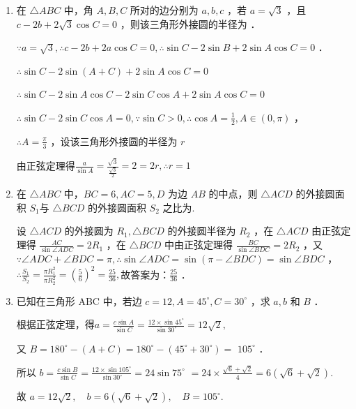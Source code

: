 \begin{enumerate}
\item 在 $\triangle A B C$ 中，角 $A, B, C$ 所对的边分别为 $a, b, c$ ，若 $a=\sqrt{3}$ ，且 $c-2 b+2 \sqrt{3} \cos C=0$ ，则该三角形外接圆的半径为 ．

\begin{jieda}
$\because a=\sqrt{3}, \therefore c-2 b+2 a \cos C=0, \therefore \sin C-2 \sin B+2 \sin A \cos C=0$ ．

$\therefore \sin C-2 \sin (A+C)+2 \sin A \cos C=0$

$\therefore \sin C-2 \sin A \cos C-2 \sin C \cos A+2 \sin A \cos C=0$

$\therefore \sin C-2 \sin C \cos A=0, \because \sin C>0, \therefore \cos A=\frac{1}{2}, A \in(0, \pi)$ ，

$\therefore A=\frac{\pi}{3}$ ，设该三角形外接圆的半径为 $r$

由正弦定理得$\frac{a}{\sin A}=\frac{\sqrt{3}}{\frac{\sqrt{3}}{2}}=2=2 r, \therefore r=1$
\end{jieda}


\item 在 $\triangle A B C$ 中，$B C=6, A C=5, D$ 为边 $A B$ 的中点，则 $\triangle A C D$ 的外接圆面积 $S_1$与 $\triangle B C D$ 的外接圆面积 $S_2$ 之比为.
\begin{jieda}
    设 $\triangle A C D$ 的外接圆为 $R_1, \triangle B C D$ 的外接圆半径为 $R_2$ ，在 $\triangle A C D$ 由正弦定理得 $\frac{A C}{\sin \angle A D C}=2 R_1$ ，在 $\triangle B C D$ 中由正弦定理得 $\frac{B C}{\sin \angle B D C}=2 R_2$ ，又 $\because \angle A D C+\angle B D C=\pi, \therefore \sin \angle A D C=\sin (\pi-\angle B D C)=\sin \angle B D C$ ，$\therefore \frac{S_1}{S_2}=\frac{\pi R_1^2}{\pi R_2^2}=\left(\frac{5}{6}\right)^2=\frac{25}{36},$故答案为：$\frac{25}{36}$ ．
\end{jieda}

\item 已知在三角形 ABC 中，若边 $c=12, A=45^{\circ}, C=30^{\circ}$ ，求 $a, b$ 和 $B$ ．
\begin{jieda}
    根据正弦定理，得$a=\frac{c \sin A}{\sin C}=\frac{12 \times \sin 45^{\circ}}{\sin 30^{\circ}}=12 \sqrt{2},$

又 $B=180^{\circ}-(A+C)=180^{\circ}-\left(45^{\circ}+30^{\circ}\right)=$ $105^{\circ}$ ．

所以 $b=\frac{c \sin B}{\sin C}=\frac{12 \times \sin 105^{\circ}}{\sin 30^{\circ}}=24 \sin 75^{\circ}$ $=24 \times \frac{\sqrt{6}+\sqrt{2}}{4}=6(\sqrt{6}+\sqrt{2})$.

故 $a=12 \sqrt{2},\quad b=6(\sqrt{6}+\sqrt{2}),\quad B=105^{\circ}$.


\end{jieda}
\end{enumerate}
